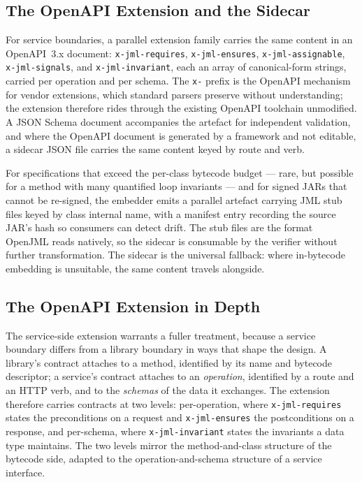 \subsection{The OpenAPI Extension and the Sidecar}

For service boundaries, a parallel extension family carries the same content in
an OpenAPI~3.x document: \texttt{x-jml-requires}, \texttt{x-jml-ensures},
\texttt{x-jml-assignable}, \texttt{x-jml-signals}, and \texttt{x-jml-invariant},
each an array of canonical-form strings, carried per operation and per schema.
The \texttt{x-} prefix is the OpenAPI mechanism for vendor extensions, which
standard parsers preserve without understanding; the extension therefore rides
through the existing OpenAPI toolchain unmodified. A JSON Schema document
accompanies the artefact for independent validation, and where the OpenAPI
document is generated by a framework and not editable, a sidecar JSON file
carries the same content keyed by route and verb.

For specifications that exceed the per-class bytecode budget --- rare, but
possible for a method with many quantified loop invariants --- and for signed
JARs that cannot be re-signed, the embedder emits a parallel artefact carrying
JML stub files keyed by class internal name, with a manifest entry recording the
source JAR's hash so consumers can detect drift. The stub files are the format
OpenJML reads natively, so the sidecar is consumable by the verifier without
further transformation. The sidecar is the universal fallback: where in-bytecode
embedding is unsuitable, the same content travels alongside.

\subsection{The OpenAPI Extension in Depth}

The service-side extension warrants a fuller treatment, because a service boundary
differs from a library boundary in ways that shape the design. A library's contract
attaches to a method, identified by its name and bytecode descriptor; a service's
contract attaches to an \emph{operation}, identified by a route and an HTTP verb,
and to the \emph{schemas} of the data it exchanges. The extension therefore carries
contracts at two levels: per-operation, where \texttt{x-jml-requires} states the
preconditions on a request and \texttt{x-jml-ensures} the postconditions on a
response, and per-schema, where \texttt{x-jml-invariant} states the invariants a
data type maintains. The two levels mirror the method-and-class structure of the
bytecode side, adapted to the operation-and-schema structure of a service
interface.

